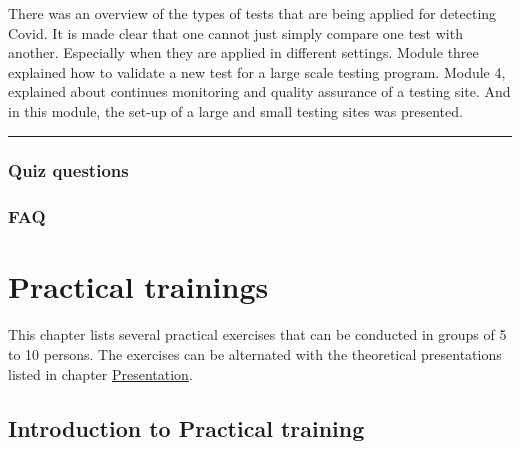 \documentclass[
]{book}
\begin{document}
There was an overview of the types of tests that are being applied for
detecting Covid. It is made clear that one cannot just simply compare
one test with another. Especially when they are applied in different
settings. Module three explained how to validate a new test for a large
scale testing program. Module 4, explained about continues monitoring
and quality assurance of a testing site. And in this module, the set-up
of a large and small testing sites was presented.

\begin{center}\rule{0.5\linewidth}{0.5pt}\end{center}

\hypertarget{quiz-questions-3}{%
\subsection{Quiz questions}\label{quiz-questions-3}}

\hypertarget{faq-3}{%
\subsection{FAQ}\label{faq-3}}

\hypertarget{pract}{%
\chapter{Practical trainings}\label{pract}}

This chapter lists several practical exercises that can be conducted in groups of 5 to 10 persons. The exercises can be alternated with the theoretical presentations listed in chapter \protect\hyperlink{presentation}{Presentation}.

\hypertarget{introduction-to-practical-training}{%
\section{Introduction to Practical training}\label{introduction-to-practical-training}}
\end{document}
